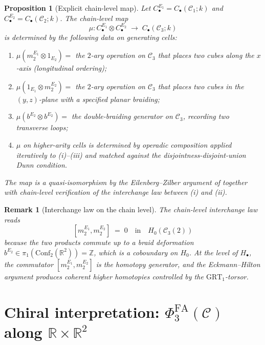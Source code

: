 \documentclass[11pt]{article}
\newtheorem{proposition}[theorem]{Proposition}
\newtheorem{remark}[theorem]{Remark}
\newcommand{\Cube}{\mathscr{C}}
\newcommand{\Conf}{\mathrm{Conf}}
\newcommand{\R}{\mathbb{R}}
\newcommand{\Z}{\mathbb{Z}}
\newcommand{\PhiFA}{\Phi^{\mathrm{FA}}}
\newcommand{\cC}{\mathcal{C}}
\begin{document}
\begin{proposition}[Explicit chain-level map]
\label{prop:explicit-chain-map}
Let $C_{\bullet}^{E_{1}} = C_{\bullet}(\Cube_{1}; k)$ and $C_{\bullet}^{E_{2}}
= C_{\bullet}(\Cube_{2}; k)$. The chain-level map
\[
  \mu \colon C_{\bullet}^{E_{1}} \otimes C_{\bullet}^{E_{2}}
  \;\to\; C_{\bullet}(\Cube_{3}; k)
\]
is determined by the following data on generating cells:
\begin{enumerate}[label=(\roman*)]
  \item $\mu(m_{2}^{E_{1}} \otimes 1_{E_{2}}) = $ the $2$-ary
    operation on $\Cube_{3}$ that places two cubes along the $x$-axis
    (longitudinal ordering);
  \item $\mu(1_{E_{1}} \otimes m_{2}^{E_{2}}) = $ the $2$-ary
    operation on $\Cube_{3}$ that places two cubes in the $(y, z)$-plane
    with a specified planar braiding;
  \item $\mu(b^{E_{2}} \otimes b^{E_{2}}) = $ the double-braiding
    generator on $\Cube_{3}$, recording two transverse loops;
  \item $\mu$ on higher-arity cells is determined by operadic
    composition applied iteratively to (i)--(iii) and matched against
    the disjointness-disjoint-union Dunn condition.
\end{enumerate}
The map is a quasi-isomorphism by the Eilenberg--Zilber argument of
 together with chain-level verification of the
interchange law between (i) and (ii).
\end{proposition}

\begin{remark}[Interchange law on the chain level]
The chain-level interchange law reads
\[
  [m_{2}^{E_{1}}, m_{2}^{E_{2}}] \;=\; 0 \quad\text{in}\quad
  H_{0}(\Cube_{3}(2))
\]
because the two products commute up to a braid deformation
$b^{E_{2}} \in \pi_{1}(\Conf_{2}(\R^{2})) = \Z$, which is a coboundary
on $H_{0}$. At the level of $H_{\bullet}$, the commutator $[m_{2}^{E_{1}},
m_{2}^{E_{2}}]$ is the homotopy generator, and the Eckmann--Hilton
argument produces coherent higher homotopies controlled by the
$\mathrm{GRT}_{1}$-torsor.
\end{remark}

\section{Chiral interpretation: $\PhiFA_{3}(\cC)$ along $\R \times \R^{2}$}
\label{sec:chiral-interpretation}
\end{document}
